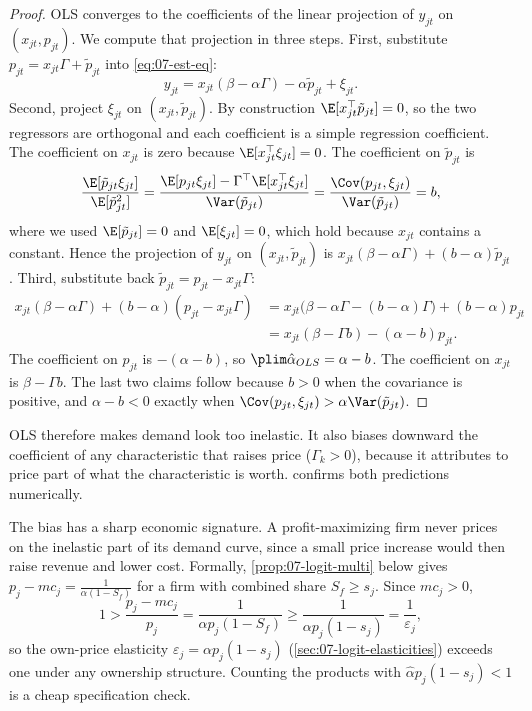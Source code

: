 \begin{proof}
OLS converges to the coefficients of the linear projection of $y_{jt}$ on $(x_{jt}, p_{jt})$. We compute that
projection in three steps. First, substitute $p_{jt} = x_{jt}\Gamma + \tilde p_{jt}$ into \eqref{eq:07-est-eq}:
\begin{equation*}
  y_{jt} = x_{jt}(\beta - \alpha\Gamma) - \alpha\tilde p_{jt} + \xi_{jt}.
\end{equation*}
Second, project $\xi_{jt}$ on $(x_{jt}, \tilde p_{jt})$. By construction $\E[x_{jt}^\top\tilde p_{jt}] = 0$, so the
two regressors are orthogonal and each coefficient is a simple regression coefficient. The coefficient on $x_{jt}$ is
zero because $\E[x_{jt}^\top\xi_{jt}] = 0$. The coefficient on $\tilde p_{jt}$ is
\begin{equation*}
  \frac{\E[\tilde p_{jt}\xi_{jt}]}{\E[\tilde p_{jt}^2]} = \frac{\E[p_{jt}\xi_{jt}] - \Gamma^\top\E[x_{jt}^\top
  \xi_{jt}]}{\Var(\tilde p_{jt})} = \frac{\Cov(p_{jt}, \xi_{jt})}{\Var(\tilde p_{jt})} = b,
\end{equation*}
where we used $\E[\tilde p_{jt}] = 0$ and $\E[\xi_{jt}] = 0$, which hold because $x_{jt}$ contains a constant. Hence
the projection of $y_{jt}$ on $(x_{jt}, \tilde p_{jt})$ is $x_{jt}(\beta - \alpha\Gamma) + (b - \alpha)\tilde p_{jt}$.
Third, substitute back $\tilde p_{jt} = p_{jt} - x_{jt}\Gamma$:
\begin{align*}
  x_{jt}(\beta - \alpha\Gamma) + (b - \alpha)(p_{jt} - x_{jt}\Gamma)
  &= x_{jt}\bigl(\beta - \alpha\Gamma - (b - \alpha)\Gamma\bigr) + (b - \alpha)p_{jt} \\
  &= x_{jt}(\beta - \Gamma b) - (\alpha - b)p_{jt}.
\end{align*}
The coefficient on $p_{jt}$ is $-(\alpha - b)$, so $\plim\hat\alpha_{OLS} = \alpha - b$. The coefficient on $x_{jt}$
is $\beta - \Gamma b$. The last two claims follow because $b > 0$ when the covariance is positive, and $\alpha - b < 0$
exactly when $\Cov(p_{jt}, \xi_{jt}) > \alpha\Var(\tilde p_{jt})$.
\end{proof}

OLS therefore makes demand look too inelastic. It also biases downward the coefficient of any characteristic that
raises price ($\Gamma_k > 0$), because it attributes to price part of what the characteristic is worth.
 confirms both predictions numerically.

The bias has a sharp economic signature. A profit-maximizing firm never prices on the inelastic part of its demand
curve, since a small price increase would then raise revenue and lower cost. Formally, \cref{prop:07-logit-multi}
below gives $p_j - mc_j = \frac{1}{\alpha(1 - S_f)}$ for a firm with combined share $S_f \geq s_j$. Since $mc_j > 0$,
\begin{equation}\label{eq:07-elastic-check}
  1 > \frac{p_j - mc_j}{p_j} = \frac{1}{\alpha p_j (1 - S_f)} \geq \frac{1}{\alpha p_j (1 - s_j)} = \frac{1}{\varepsilon_j},
\end{equation}
so the own-price elasticity $\varepsilon_j = \alpha p_j(1 - s_j)$ (\cref{sec:07-logit-elasticities}) exceeds one
under any ownership structure. Counting the products with $\hat\alpha p_j(1 - s_j) < 1$ is a cheap specification
check.

